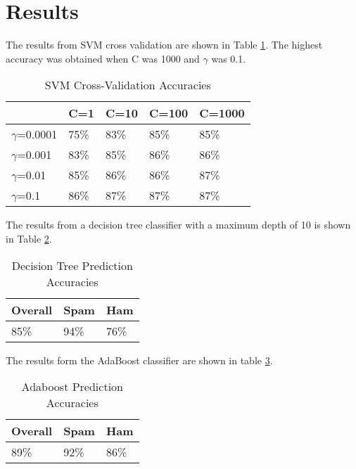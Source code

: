 \section{Results}
The results from SVM cross validation are shown in Table \ref{svm-cross-val}. The highest accuracy was obtained when C was 1000 and $\gamma$ was 0.1.

\begin{table}[!hp]
\centering
\caption{SVM Cross-Validation Accuracies}
\label{svm-cross-val}
\begin{tabular}{|l|l|l|l|l|}
\hline
               & C=1 & C=10 & C=100 & C=1000 \\ \hline
$\gamma$=0.0001 & 75\%  & 83\%   & 85\%    & 85\%     \\ \hline
$\gamma$=0.001  & 83\%  & 85\%   & 86\%    & 86\%     \\ \hline
$\gamma$=0.01   & 85\%  & 86\%   & 86\%    & 87\%     \\ \hline
$\gamma$=0.1    & 86\%  & 87\%   & 87\%    & 87\%     \\ \hline
\end{tabular}
\end{table}

The results from a decision tree classifier with a maximum depth of 10 is shown in Table \ref{decision-tree-acc}.
\begin{table}[!hp]
\centering
\caption{Decision Tree Prediction Accuracies}
\label{decision-tree-acc}
\begin{tabular}{|l|l|l|}
\hline
        Overall       &  Spam   &  Ham   \\ \hline
         85\%         &  94\%   & 76\%  \\ \hline
\end{tabular}
\end{table}

The results form the AdaBoost classifier are shown in table \ref{ada-boost-acc}.

\begin{table}[hp]
\centering
\caption{Adaboost Prediction Accuracies}
\label{ada-boost-acc}
\begin{tabular}{|l|l|l|}
\hline
        Overall       &  Spam   &  Ham   \\ \hline
         89\%         &  92\%   & 86\%  \\ \hline
\end{tabular}
\end{table}



